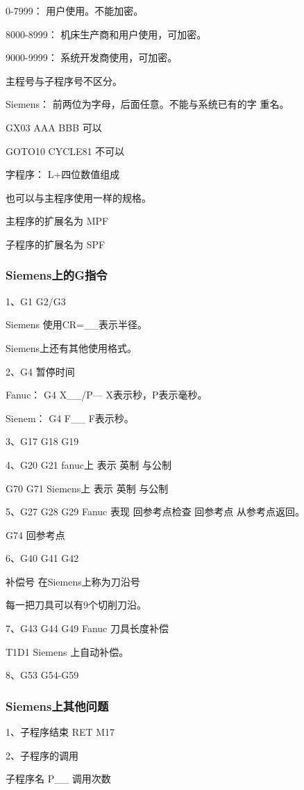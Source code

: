 0-7999： 用户使用。不能加密。

8000-8999： 机床生产商和用户使用，可加密。

9000-9999： 系统开发商使用，可加密。

主程号与子程序号不区分。

Siemens：  前两位为字母，后面任意。不能与系统已有的字
重名。

GX03  AAA  BBB   可以

GOTO10  CYCLE81   不可以

字程序：   L+四位数值组成

也可以与主程序使用一样的规格。

主程序的扩展名为  MPF

子程序的扩展名为  SPF

\subsubsection{Siemens上的G指令}
1、G1    G2/G3

Siemens  使用CR=\_\_表示半径。

Siemens上还有其他使用格式。

2、G4  暂停时间

Fanuc： G4 X\_\_/P—  X表示秒，P表示毫秒。

Sienem： G4 F\_\_   F表示秒。

3、G17  G18  G19

4、G20  G21    fanuc上 表示 英制 与公制

G70  G71   Siemens上 表示 英制 与公制

5、G27 G28 G29  Fanuc 表现 回参考点检查  回参考点  从参考点返回。

G74  回参考点

6、G40  G41  G42

补偿号   在Siemens上称为刀沿号

每一把刀具可以有9个切削刀沿。

7、G43 G44  G49  Fanuc 刀具长度补偿

T1D1  Siemens 上自动补偿。

8、G53 G54-G59

\subsubsection{Siemens上其他问题}

1、子程序结束 RET M17

2、子程序的调用 

子程序名  P\_\_ 调用次数


